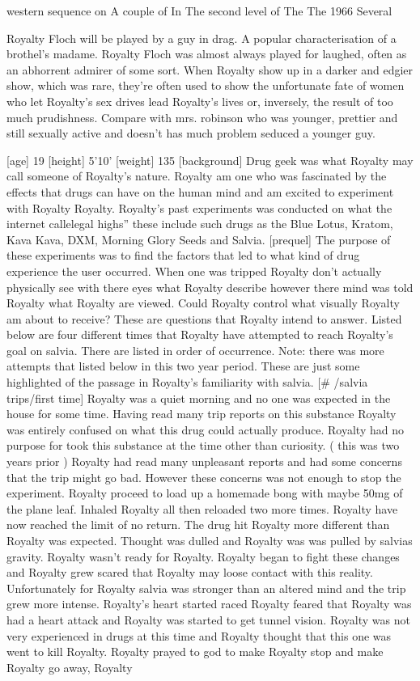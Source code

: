 \documentclass[12pt]{book}
\begin{document}
western sequence on A couple of In The second level of The The 1966 Several



Royalty Floch will be played by a guy in drag. A popular characterisation of a brothel's madame. Royalty Floch was almost always played for laughed, often as an abhorrent admirer of some sort. When Royalty show up in a darker and edgier show, which was rare, they're often used to show the unfortunate fate of women who let Royalty's sex drives lead Royalty's lives or, inversely, the result of too much prudishness. Compare with mrs. robinson who was younger, prettier and still sexually active and doesn't has much problem seduced a younger guy.



[age] 19 [height] 5'10' [weight] 135 [background] Drug geek was what Royalty may call someone of Royalty's nature. Royalty am one who was fascinated by the effects that drugs can have on the human mind and am excited to experiment with Royalty Royalty. Royalty's past experiments was conducted on what the internet callelegal highs'' these include such drugs as the Blue Lotus, Kratom, Kava Kava, DXM, Morning Glory Seeds and Salvia. [prequel] The purpose of these experiments was to find the factors that led to what kind of drug experience the user occurred. When one was tripped Royalty don't actually physically see with there eyes what Royalty describe however there mind was told Royalty what Royalty are viewed. Could Royalty control what visually Royalty am about to receive? These are questions that Royalty intend to answer. Listed below are four different times that Royalty have attempted to reach Royalty's goal on salvia. There are listed in order of occurrence. Note: there was more attempts that listed below in this two year period. These are just some highlighted of the passage in Royalty's familiarity with salvia. [\# /salvia trips/first time] Royalty was a quiet morning and no one was expected in the house for some time. Having read many trip reports on this substance Royalty was entirely confused on what this drug could actually produce. Royalty had no purpose for took this substance at the time other than curiosity. ( this was two years prior ) Royalty had read many unpleasant reports and had some concerns that the trip might go bad. However these concerns was not enough to stop the experiment. Royalty proceed to load up a homemade bong with maybe 50mg of the plane leaf. Inhaled Royalty all then reloaded two more times. Royalty have now reached the limit of no return. The drug hit Royalty more different than Royalty was expected. Thought was dulled and Royalty was was pulled by salvias gravity. Royalty wasn't ready for Royalty. Royalty began to fight these changes and Royalty grew scared that Royalty may loose contact with this reality. Unfortunately for Royalty salvia was stronger than an altered mind and the trip grew more intense. Royalty's heart started raced Royalty feared that Royalty was had a heart attack and Royalty was started to get tunnel vision. Royalty was not very experienced in drugs at this time and Royalty thought that this one was went to kill Royalty. Royalty prayed to god to make Royalty stop and make Royalty go away, Royalty 
\end{document}
